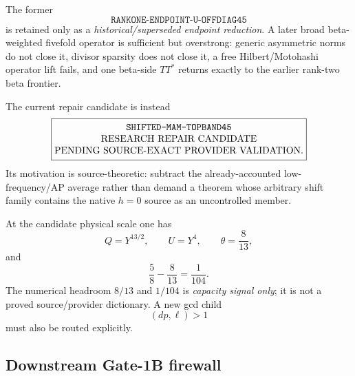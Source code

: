 \documentclass[11pt]{article}
\theoremstyle{definition}
\newcommand{\1}{\mathbf 1}
\begin{document}
The former
\[
\texttt{RANKONE-ENDPOINT-U-OFFDIAG45}
\]
is retained only as a \emph{historical/superseded endpoint reduction}.  A later broad
beta-weighted fivefold operator is sufficient but overstrong: generic asymmetric norms do
not close it, divisor sparsity does not close it, a free Hilbert/Motohashi operator lift
fails, and one beta-side $TT^\ast$ returns exactly to the earlier rank-two beta frontier.

The current repair candidate is instead
\[
\boxed{\begin{gathered}
\text{\ttfamily SHIFTED-MAM-TOPBAND45}\\[-1mm]
\text{RESEARCH REPAIR CANDIDATE}\\[-1mm]
\text{PENDING SOURCE-EXACT PROVIDER VALIDATION}.
\end{gathered}}
\]
Its motivation is source-theoretic: subtract the already-accounted low-frequency/AP average
rather than demand a theorem whose arbitrary shift family contains the native $h=0$ source
as an uncontrolled member.

At the candidate physical scale one has
\[
Q=Y^{13/2},\qquad U=Y^4,\qquad \theta=\frac8{13},
\]
and
\[
\frac58-\frac8{13}=\frac1{104}.
\]
The numerical headroom $8/13$ and $1/104$ is \emph{capacity signal only}; it is not a
proved source/provider dictionary.  A new gcd child
\[
(dp,\ell)>1
\]
must also be routed explicitly.

\subsection{Downstream Gate-1B firewall}
\end{document}
